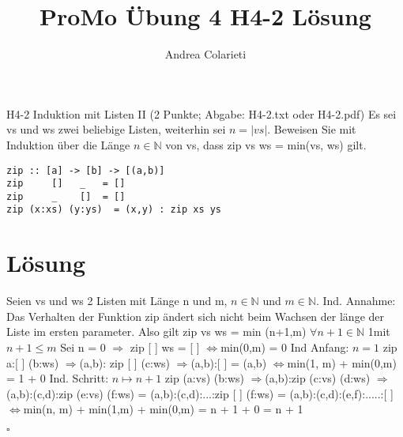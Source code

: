 \documentclass[10pt,a4paper]{article}
\author{Andrea Colarieti}
\title{ProMo Übung 4 H4-2 Lösung}
\begin{document}
\maketitle

H4-2 Induktion mit Listen II
(2 Punkte; Abgabe: H4-2.txt oder H4-2.pdf)
Es sei vs und ws zwei beliebige Listen, weiterhin sei $n = |vs|$. Beweisen
Sie mit Induktion über die Länge $n \in \mathbb{N}$ von vs, dass zip vs ws = min(vs, ws) gilt.
\newline
\begin{lstlisting}
zip :: [a] -> [b] -> [(a,b)]
zip 	[] 	 _   = []
zip 	_  	 []  = []
zip (x:xs) (y:ys)  = (x,y) : zip xs ys
\end{lstlisting}

\section{Lösung}
Seien vs und ws 2 Listen mit Länge n und m, $n \in \mathbb{N}$ und $m \in \mathbb{N}$.
\newline
Ind. Annahme: 
Das Verhalten der Funktion zip ändert sich nicht beim Wachsen der länge der Liste im ersten parameter. \newline Also gilt zip vs ws = min (n+1,m)  $\forall n+1 \in \mathbb{N} $ 1mit $ n + 1 \leq m$
\newline\newline
Sei n = 0 $\Rightarrow$
\newline 
zip [ ] ws = [ ]\newline
$\Leftrightarrow$min(0,m) = 0 
\newline\newline
Ind Anfang: $n = 1 $\newline
zip a:[ ] (b:ws) $\Rightarrow$\newline (a,b): zip [ ] (c:ws) $\Rightarrow$\newline (a,b):[ ] = (a,b)\newline
$\Leftrightarrow$min(1, m) + min(0,m) = 1 + 0
\newline\newline
Ind. Schritt: $n \mapsto n + 1 $\newline 
zip (a:vs) (b:ws) $\Rightarrow$\newline (a,b):zip (c:vs) (d:ws) $\Rightarrow$\newline (a,b):(c,d):zip (e:vs) (f:ws) = (a,b):(c,d):...:zip [ ] (f:ws) = \newline (a,b):(c,d):(e,f):.....:[ ]\newline
$\Leftrightarrow$min(n, m) + min(1,m) + min(0,m) = n + 1 + 0 = n + 1 \newline
\begin{flushright}
\hfill $\square$
\end{flushright}
\end{document}
